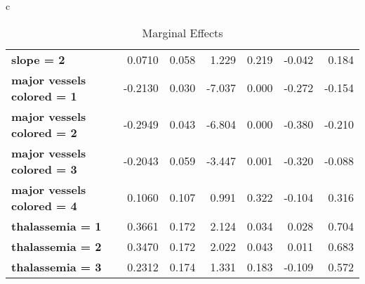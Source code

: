 \begin{table*}[!tp]
{{\begin{tabular}{c}
\begin{tabular*}{\textwidth}{l @{\extracolsep{\fill}} rrrrrr}
\textbf{slope = 2}                         &       0.0710   &        0.058     &     1.229  &         0.219        &       -0.042    &        0.184     \\
\textbf{major vessels colored = 1}         &      -0.2130   &        0.030     &    -7.037  &         0.000        &       -0.272    &       -0.154     \\
\textbf{major vessels colored = 2}         &      -0.2949   &        0.043     &    -6.804  &         0.000        &       -0.380    &       -0.210     \\
\textbf{major vessels colored = 3}         &      -0.2043   &        0.059     &    -3.447  &         0.001        &       -0.320    &       -0.088     \\
\textbf{major vessels colored = 4}         &       0.1060   &        0.107     &     0.991  &         0.322        &       -0.104    &        0.316     \\
\textbf{thalassemia = 1}                   &       0.3661   &        0.172     &     2.124  &         0.034        &        0.028    &        0.704     \\
\textbf{thalassemia = 2}                   &       0.3470   &        0.172     &     2.022  &         0.043        &        0.011    &        0.683     \\
\textbf{thalassemia = 3}                   &       0.2312   &        0.174     &     1.331  &         0.183        &       -0.109    &        0.572     \\

\end{tabular*} \\
    \bottomrule
\end{tabular}
}
}

\caption{Marginal Effects}\label{tab:marginal}
\end{table*}
